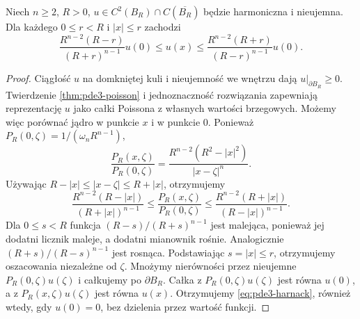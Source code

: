 \begin{stwierdzenie}
\label{prop:pde3-harnack}
Niech $n\geq2$, $R>0$, $u\in C^2(B_R)\cap C(\overline{B_R})$
będzie harmoniczna i nieujemna. Dla każdego $0\leq r<R$
i $|x|\leq r$ zachodzi
\begin{equation}\label{eq:pde3-harnack}
 \frac{R^{n-2}(R-r)}{(R+r)^{n-1}}u(0)
 \leq u(x)\leq
 \frac{R^{n-2}(R+r)}{(R-r)^{n-1}}u(0).
\end{equation}
\end{stwierdzenie}
\begin{proof}
Ciągłość $u$ na domkniętej kuli i nieujemność we wnętrzu
dają $u|_{\partial B_R}\geq0$. Twierdzenie
\ref{thm:pde3-poisson} i jednoznaczność rozwiązania
zapewniają reprezentację $u$ jako całki Poissona
z własnych wartości brzegowych. Możemy więc porównać
jądro w punkcie $x$ i w punkcie $0$.
Ponieważ $P_R(0,\zeta)=1/(\omega_n R^{n-1})$,
\[
 \frac{P_R(x,\zeta)}{P_R(0,\zeta)}
 =\frac{R^{n-2}(R^2-|x|^2)}{|x-\zeta|^n}.
\]
Używając $R-|x|\leq|x-\zeta|\leq R+|x|$,
otrzymujemy
\[
 \frac{R^{n-2}(R-|x|)}{(R+|x|)^{n-1}}
 \leq\frac{P_R(x,\zeta)}{P_R(0,\zeta)}
 \leq\frac{R^{n-2}(R+|x|)}{(R-|x|)^{n-1}}.
\]
Dla $0\leq s<R$ funkcja
$(R-s)/(R+s)^{n-1}$ jest malejąca, ponieważ jej
dodatni licznik maleje, a dodatni mianownik rośnie.
Analogicznie $(R+s)/(R-s)^{n-1}$ jest rosnąca.
Podstawiając $s=|x|\leq r$, otrzymujemy oszacowania
niezależne od $\zeta$. Mnożymy nierówności przez
nieujemne $P_R(0,\zeta)u(\zeta)$ i całkujemy po
$\partial B_R$. Całka z $P_R(0,\zeta)u(\zeta)$
jest równa $u(0)$, a z $P_R(x,\zeta)u(\zeta)$
jest równa $u(x)$. Otrzymujemy
\eqref{eq:pde3-harnack}, również wtedy, gdy $u(0)=0$,
bez dzielenia przez wartość funkcji.
\end{proof}

